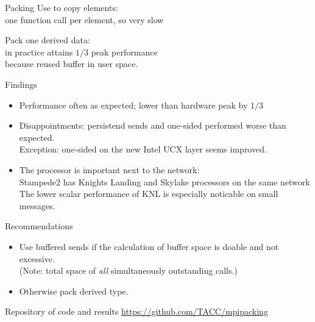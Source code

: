\documentclass[11pt,headernav]{beamer}
\begin{document}
\begin{frame}[containsverbatim]{Packing}
  Use  to copy elements:\\
  one function call per element, so very slow

  Pack one derived data:\\
  in practice attains $1/3$ peak performance\\
  because reused buffer in user space.
\end{frame}

\begin{frame}[containsverbatim]{Findings}
  \begin{itemize}
  \item Performance often as expected; lower than hardware peak by $1/3$
  \item Disappointments: persistend sends and one-sided performed
    worse than expected.\\
    Exception: one-sided on the new Intel UCX layer seems improved.
  \item The processor is important next to the network:\\
    Stampede2 has Knights Landing and Skylake processors on the same network\\
    The lower scalar performance of KNL is especially noticable on small messages.
  \end{itemize}
\end{frame}

\begin{frame}[containsverbatim]{Recommendations}
  \begin{itemize}
  \item Use buffered sends if the calculation of buffer space is
    doable and not excessive.\\
    (Note: total space of \textsl{all} simultaneously
    outstanding  calls.)
  \item Otherwise pack derived type.
  \end{itemize}
\end{frame}

\begin{frame}[containsverbatim]{Repository of code and results}
  \url{https://github.com/TACC/mpipacking}
\end{frame}
\end{document}
